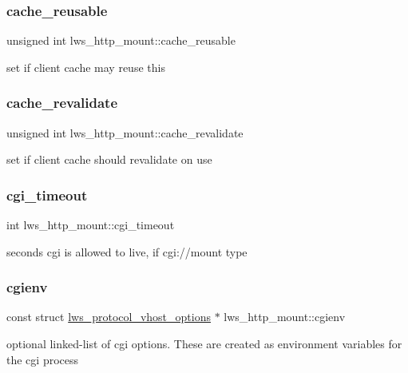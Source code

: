 \subsubsection{\texorpdfstring{cache\+\_\+reusable}{cache\_reusable}}
{\footnotesize\ttfamily unsigned int lws\+\_\+http\+\_\+mount\+::cache\+\_\+reusable}

set if client cache may reuse this \mbox{\label{structlws__http__mount_ae137203040c6153694bd88a708da5395}} 
\subsubsection{\texorpdfstring{cache\+\_\+revalidate}{cache\_revalidate}}
{\footnotesize\ttfamily unsigned int lws\+\_\+http\+\_\+mount\+::cache\+\_\+revalidate}

set if client cache should revalidate on use \mbox{\label{structlws__http__mount_a4a7239d6d4c03986e6e1a72abb6c83aa}} 
\subsubsection{\texorpdfstring{cgi\+\_\+timeout}{cgi\_timeout}}
{\footnotesize\ttfamily int lws\+\_\+http\+\_\+mount\+::cgi\+\_\+timeout}

seconds cgi is allowed to live, if cgi\+://mount type \mbox{\label{structlws__http__mount_a54356a84ec5f290ac6e5b06ba6fce33f}} 
\subsubsection{\texorpdfstring{cgienv}{cgienv}}
{\footnotesize\ttfamily const struct \hyperlink{structlws__protocol__vhost__options}{lws\+\_\+protocol\+\_\+vhost\+\_\+options} $\ast$ lws\+\_\+http\+\_\+mount\+::cgienv}

optional linked-\/list of cgi options. These are created as environment variables for the cgi process \mbox{\label{structlws__http__mount_adbe95138563f177bfe3dd8abb268c396}} 
